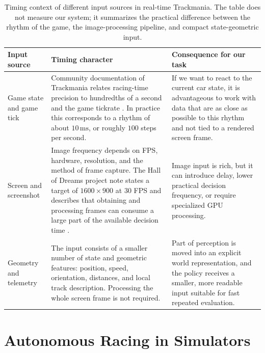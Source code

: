 \begin{table}[htbp]
    \centering
    \small
    \setlength{\tabcolsep}{4pt}
    \renewcommand{\arraystretch}{1.18}
    \caption[Timing context of image input]{Timing context of different input sources in real-time Trackmania. The table does not measure our system; it summarizes the practical difference between the rhythm of the game, the image-processing pipeline, and compact state-geometric input.}
    \label{tab:related_input_frequency}
    \begin{tabular}{>{\raggedright\arraybackslash}p{}
                    >{\raggedright\arraybackslash}p{}
                    >{\raggedright\arraybackslash}p{}}
        \toprule
        Input source & Timing character & Consequence for our task \\
        \midrule
        Game state and game tick &
        Community documentation of Trackmania relates racing-time precision to hundredths of a second and the game tickrate \cite{trackmania_wiki_units2026}. In practice this corresponds to a rhythm of about \(10\,\mathrm{ms}\), or roughly \(100\) steps per second. &
        If we want to react to the current car state, it is advantageous to work with data that are as close as possible to this rhythm and not tied to a rendered screen frame. \\
        Screen and screenshot &
        Image frequency depends on FPS, hardware, resolution, and the method of frame capture. The Hall of Dreams project note states a target of \(1600\times900\) at \(30\) FPS and describes that obtaining and processing frames can consume a large part of the available decision time \cite{hallofdreams_trackmania_eyes2026}. &
        Image input is rich, but it can introduce delay, lower practical decision frequency, or require specialized GPU processing. \\
        Geometry and telemetry &
        The input consists of a smaller number of state and geometric features: position, speed, orientation, distances, and local track description. Processing the whole screen frame is not required. &
        Part of perception is moved into an explicit world representation, and the policy receives a smaller, more readable input suitable for fast repeated evaluation. \\
        \bottomrule
    \end{tabular}
\end{table}

\section{Autonomous Racing in Simulators}

